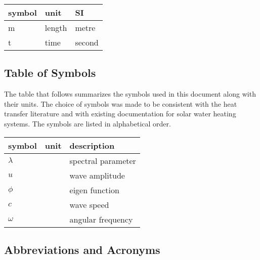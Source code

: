 \documentclass[12pt]{article}
\begin{document}
\renewcommand{\arraystretch}{1.2}
  \noindent \begin{tabular}{l l l} 
    \toprule		
    \textbf{symbol} & \textbf{unit} & \textbf{SI}\\
    \midrule 
    \si{\metre} & length & metre\\
    t & time & second\\
    \bottomrule
  \end{tabular}


\subsection{Table of Symbols}

The table that follows summarizes the symbols used in this document along with
their units.  The choice of symbols was made to be consistent with the heat
transfer  literature and with existing documentation for solar water heating
systems.  The symbols are listed in alphabetical order.

\renewcommand{\arraystretch}{1.2}
\noindent \begin{longtable*}{l l p{12cm}} \toprule
\textbf{symbol} & \textbf{unit} & \textbf{description}\\
\midrule 
$\lambda$ &  & spectral parameter
\\
$u$ &  & wave amplitude 
\\  
$\phi$ & & eigen function
\\ 
$c$ & & wave speed 
\\
$\omega$ & & angular frequency 
\\ 
\bottomrule
\end{longtable*}

\subsection{Abbreviations and Acronyms}
\end{document}

